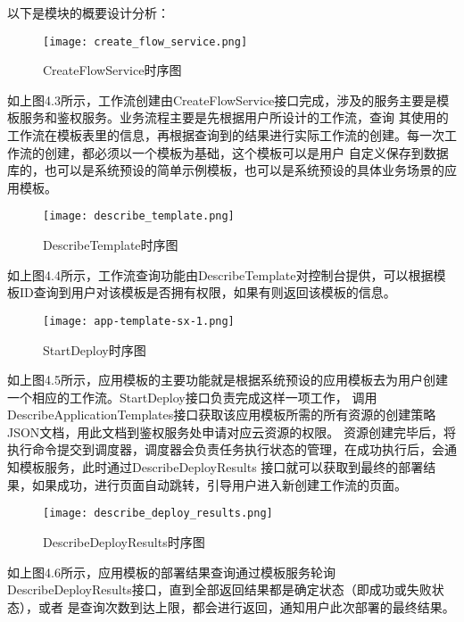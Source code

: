 以下是模块的概要设计分析：

\begin{figure}[H]
    \centering
    \texttt{[image: create\_flow\_service.png]}
    \caption{CreateFlowService时序图}
    \label{fig:CreateFlowService时序图}
    \note{}
\end{figure}

如上图4.3所示，工作流创建由CreateFlowService接口完成，涉及的服务主要是模板服务和鉴权服务。业务流程主要是先根据用户所设计的工作流，查询
其使用的工作流在模板表里的信息，再根据查询到的结果进行实际工作流的创建。每一次工作流的创建，都必须以一个模板为基础，这个模板可以是用户
自定义保存到数据库的，也可以是系统预设的简单示例模板，也可以是系统预设的具体业务场景的应用模板。


\begin{figure}[H]
    \centering
    \texttt{[image: describe\_template.png]}
    \caption{DescribeTemplate时序图}
    \label{fig:DescribeTemplate时序图}
    \note{}
\end{figure}

如上图4.4所示，工作流查询功能由DescribeTemplate对控制台提供，可以根据模板ID查询到用户对该模板是否拥有权限，如果有则返回该模板的信息。



\begin{figure}[H]
    \centering
    \texttt{[image: app-template-sx-1.png]}
    \caption{StartDeploy时序图}
    \label{fig:StartDeploy时序图}
\end{figure}
如上图4.5所示，应用模板的主要功能就是根据系统预设的应用模板去为用户创建一个相应的工作流。StartDeploy接口负责完成这样一项工作，
调用DescribeApplicationTemplates接口获取该应用模板所需的所有资源的创建策略JSON文档，用此文档到鉴权服务处申请对应云资源的权限。
资源创建完毕后，将执行命令提交到调度器，调度器会负责任务执行状态的管理，在成功执行后，会通知模板服务，此时通过DescribeDeployResults
接口就可以获取到最终的部署结果，如果成功，进行页面自动跳转，引导用户进入新创建工作流的页面。

\begin{figure}[h]
    \centering
    \texttt{[image: describe\_deploy\_results.png]}
    \caption{DescribeDeployResults时序图}
    \label{fig:DescribeDeployResults时序图}
\end{figure}
如上图4.6所示，应用模板的部署结果查询通过模板服务轮询DescribeDeployResults接口，直到全部返回结果都是确定状态（即成功或失败状态），或者
是查询次数到达上限，都会进行返回，通知用户此次部署的最终结果。

